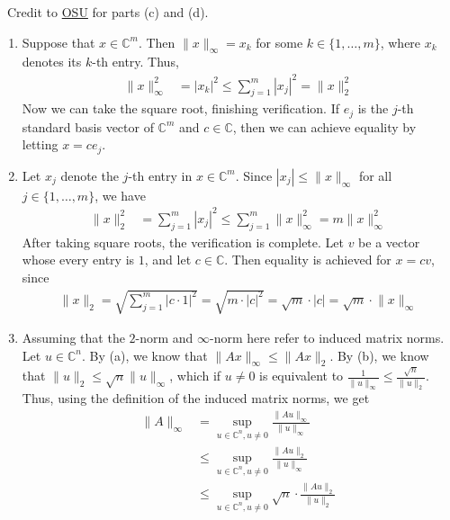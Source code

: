 \documentclass[12pt]{article}
\newenvironment{sol}[1][Solution]{\begin{trivlist}
		\item[\hskip \labelsep {\bfseries #1:}]}{\end{trivlist}}
\begin{document}
\begin{sol}
	\
	Credit to \href{https://sites.science.oregonstate.edu/~restrepo/MTH451/HW/HW1Solution.pdf}{OSU}
	for parts (c) and (d).
	\begin{enumerate}[label=(\alph*)]
		\item Suppose that $x\in \mathbb{C}^m$. Then $\lVert x\rVert_\infty=x_k$ for some
		$k\in\{1,\ldots,m\}$, where $x_k$ denotes its $k$-th entry. Thus,
		\begin{align*}
			\lVert x\rVert_\infty^2 &= |x_k|^2 \leq \sum_{j=1}^{m}|x_{j}|^2=\lVert x\rVert_2^2
		\end{align*}
		Now we can take the square root, finishing verification. If $e_j$ is the $j$-th standard
		basis vector of $\mathbb{C}^m$ and $c\in\mathbb{C}$, then we can achieve equality by
		letting $x=c e_j$.
		\item Let $x_j$ denote the $j$-th entry in $x\in\mathbb{C}^m$. Since
		$|x_j|\leq \lVert x\rVert_{\infty}$ for all $j\in\{1,\ldots,m\}$, we have
		\begin{align*}
			\lVert x\rVert_2^2&=\sum_{j=1}^{m}|x_j|^2\leq \sum_{j=1}^{m}\lVert x\rVert_{\infty}^2
			=m\lVert x\rVert_{\infty}^2
		\end{align*}
		After taking square roots, the verification is complete. Let $v$ be a vector whose every
		entry is $1$, and let $c\in\mathbb{C}$. Then equality is achieved for $x=cv$, since
		\begin{align*}
			\lVert x\rVert_2 = \sqrt{\sum_{j=1}^{m}|c\cdot 1|^2}=\sqrt{m\cdot |c|^2} = \sqrt{m}\cdot |c|=\sqrt{m}\cdot \lVert x\rVert_\infty
		\end{align*}
		\item Assuming that the $2$-norm and $\infty$-norm here refer to induced matrix norms. Let
		$u\in \mathbb{C}^n$. By (a), we know that $\lVert Ax\rVert_{\infty}\leq \lVert Ax\rVert_2$.
		By (b), we know that $\lVert u\rVert_2 \leq \sqrt{n}\lVert u\rVert_{\infty}$, which if
		$u\neq 0$ is equivalent to $\frac{1}{\lVert u\rVert_{\infty}}\leq \frac{\sqrt{n}}{\lVert u\rVert_2}$.
		Thus, using the definition of the induced matrix norms, we get
		\begin{align*}
			\lVert A\rVert_{\infty} &= \sup_{u\in\mathbb{C}^n,u\neq 0}\frac{\lVert Au\rVert_{\infty}}{\lVert u\rVert_{\infty}}\\
			&\leq \sup_{u\in\mathbb{C}^n,u\neq 0}\frac{\lVert Au\rVert_2}{\lVert u\rVert_{\infty}}\\
			&\leq \sup_{u\in\mathbb{C}^n,u\neq 0}\sqrt{n}\cdot \frac{\lVert Au\rVert_2}{\lVert u\rVert_2}\\\\

\end{align*}
\end{enumerate}
\end{sol}
\end{document}
